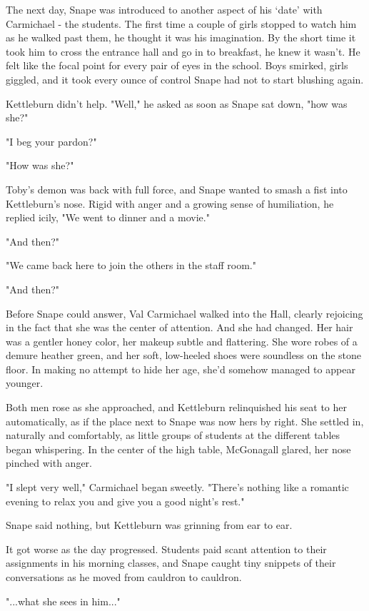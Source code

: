 \documentclass[a4paper,11pt]{article}
\begin{document}
The next day, Snape was introduced to another aspect of his `date' with Carmichael - the students. The first time a couple of girls stopped to watch him as he walked past them, he thought it was his imagination. By the short time it took him to cross the entrance hall and go in to breakfast, he knew it wasn't. He felt like the focal point for every pair of eyes in the school. Boys smirked, girls giggled, and it took every ounce of control Snape had not to start blushing again.

Kettleburn didn't help. "Well," he asked as soon as Snape sat down, "how was she?"

"I beg your pardon?"

"How was she?"

Toby's demon was back with full force, and Snape wanted to smash a fist into Kettleburn's nose. Rigid with anger and a growing sense of humiliation, he replied icily, "We went to dinner and a movie."

"And then?"

"We came back here to join the others in the staff room."

"And then?"

Before Snape could answer, Val Carmichael walked into the Hall, clearly rejoicing in the fact that she was the center of attention. And she had changed. Her hair was a gentler honey color, her makeup subtle and flattering. She wore robes of a demure heather green, and her soft, low-heeled shoes were soundless on the stone floor. In making no attempt to hide her age, she'd somehow managed to appear younger.

Both men rose as she approached, and Kettleburn relinquished his seat to her automatically, as if the place next to Snape was now hers by right. She settled in, naturally and comfortably, as little groups of students at the different tables began whispering. In the center of the high table, McGonagall glared, her nose pinched with anger.

"I slept very well," Carmichael began sweetly. "There's nothing like a romantic evening to relax you and give you a good night's rest."

Snape said nothing, but Kettleburn was grinning from ear to ear.

It got worse as the day progressed. Students paid scant attention to their assignments in his morning classes, and Snape caught tiny snippets of their conversations as he moved from cauldron to cauldron.

"...what she sees in him..."
\end{document}
